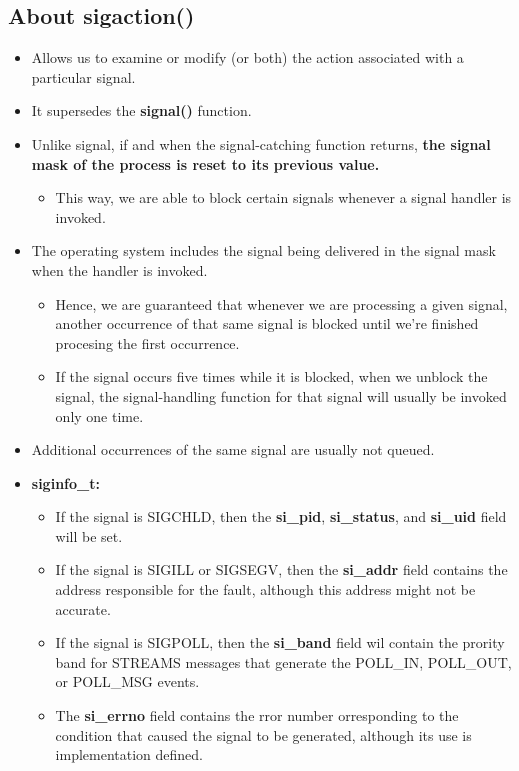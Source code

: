 \documentclass{article}
\begin{document}
\subsection{About \textbf{sigaction()}}
\begin{itemize}
    \item Allows us to examine or modify (or both) the action associated with a particular signal.
    \item It supersedes the \textbf{signal()} function.
    \item Unlike signal, if and when the signal-catching function returns, \textbf{the signal mask of the process is reset to its previous value.}
        \begin{itemize}
            \item This way, we are able to block certain signals whenever a signal handler is invoked.
        \end{itemize}
    \item The operating system includes the signal being delivered in the signal mask when the handler is invoked.
        \begin{itemize}
            \item Hence, we are guaranteed that whenever we are processing a given signal, another occurrence of that same signal is blocked until we're finished procesing the first occurrence.
            \item If the signal occurs five times while it is blocked, when we unblock the signal, the signal-handling function for that signal will usually be invoked only one time.
        \end{itemize}
    \item Additional occurrences of the same signal are usually not queued.
    \item \textbf{siginfo\_t:}
        \begin{itemize}
            \item If the signal is SIGCHLD, then the \textbf{si\_pid}, \textbf{si\_status}, and \textbf{si\_uid} field will be set.
            \item If the signal is SIGILL or SIGSEGV, then the \textbf{si\_addr} field contains the address responsible for the fault, although this address might not be accurate.
            \item If the signal is SIGPOLL, then the \textbf{si\_band} field wil contain the prority band for STREAMS messages that generate the POLL\_IN, POLL\_OUT, or POLL\_MSG events.
            \item The \textbf{si\_errno} field contains the rror number orresponding to the condition that caused the signal to be generated, although its use is implementation defined.
        \end{itemize}
\end{itemize}
\end{document}
